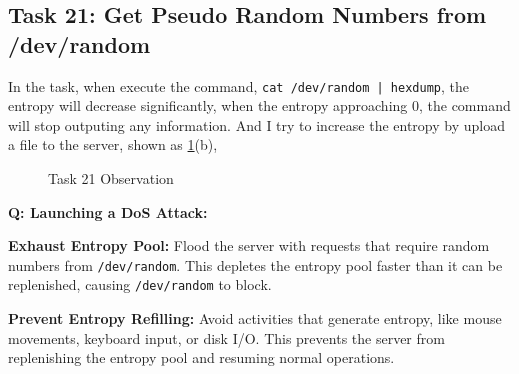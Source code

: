 \documentclass[a4paper]{article}
\begin{document}
\subsection{Task 21: Get Pseudo Random Numbers from /dev/random}
In the task, when execute the command, \verb!cat /dev/random | hexdump!, the entropy will decrease significantly, when the entropy approaching 0, the command will stop outputing any information. 
And I try to increase the entropy by upload a file to the server, shown as \ref{fig:task21}(b),
\begin{figure}[h]
    \centering
    \hfill
    \hfill
    \caption{Task 21 Observation}\label{fig:task21}
\end{figure}

\textbf{Q: Launching a DoS Attack:}

\textbf{Exhaust Entropy Pool:}
Flood the server with requests that require random numbers from \verb|/dev/random|.
This depletes the entropy pool faster than it can be replenished, causing \verb|/dev/random| to block.

\textbf{Prevent Entropy Refilling:}
Avoid activities that generate entropy, like mouse movements, keyboard input, or disk I/O.
This prevents the server from replenishing the entropy pool and resuming normal operations.
\end{document}
